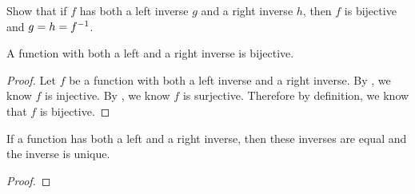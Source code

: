 \documentclass[main.tex]{subfiles}
\begin{document}
\subproblem{}\label{s2p5e}

Show that if \(f\) has both a left inverse \(g\) and a right inverse \(h\), then
\(f\) is bijective and \(g = h = {f}^{-1}\).

\begin{thm}
	A function with both a left and a right inverse is bijective.
\end{thm}
\begin{proof}
	Let \(f\) be a function with both a left inverse and a right inverse. By
	, we know \(f\) is injective. By , we know
	\(f\) is surjective. Therefore by definition, we know that \(f\) is
	bijective.
\end{proof}

\begin{thm}
	If a function has both a left and a right inverse, then these inverses
	are equal and the inverse is unique.
\end{thm}
\begin{proof}
	\todo{}
\end{proof}
\end{document}
